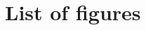 %
\section{List of figures}
%
\makeatletter
	\renewcommand\listoffigures{%
	}
\makeatother
\listoffigures

